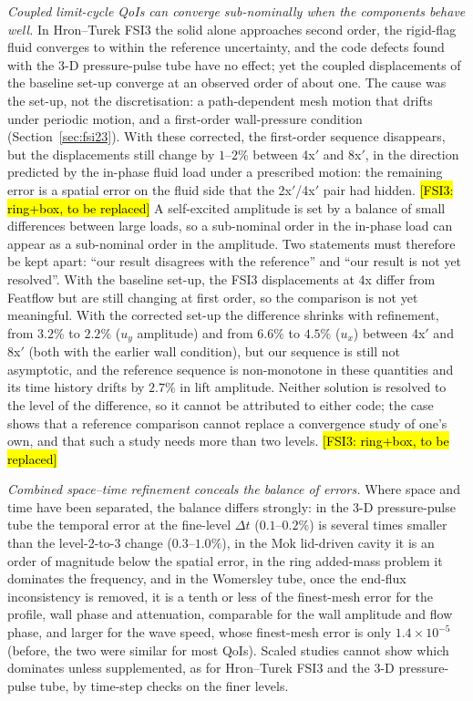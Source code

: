 \emph{Coupled limit-cycle QoIs can converge sub-nominally when the components behave well.}
In Hron--Turek FSI3 the solid alone approaches second order, the rigid-flag fluid converges to within the reference uncertainty, and the code defects found with the 3-D pressure-pulse tube have no effect; yet the coupled displacements of the baseline set-up converge at an observed order of about one. The cause was the set-up, not the discretisation: a path-dependent mesh motion that drifts under periodic motion, and a first-order wall-pressure condition (Section~\ref{sec:fsi23}). With these corrected, the first-order sequence disappears, but the displacements still change by $1$--$2\%$ between 4x$'$ and 8x$'$, in the direction predicted by the in-phase fluid load under a prescribed motion: the remaining error is a spatial error on the fluid side that the 2x$'$/4x$'$ pair had hidden. \hl{[FSI3: ring+box, to be replaced]}
A self-excited amplitude is set by a balance of small differences between large loads, so a sub-nominal order in the in-phase load can appear as a sub-nominal order in the amplitude.
Two statements must therefore be kept apart: ``our result disagrees with the reference'' and ``our result is not yet resolved''.
With the baseline set-up, the FSI3 displacements at 4x differ from Featflow but are still changing at first order, so the comparison is not yet meaningful. With the corrected set-up the difference shrinks with refinement, from $3.2\%$ to $2.2\%$ ($u_y$ amplitude) and from $6.6\%$ to $4.5\%$ ($u_x$) between 4x$'$ and 8x$'$ (both with the earlier wall condition), but our sequence is still not asymptotic, and the reference sequence is non-monotone in these quantities and its time history drifts by $2.7\%$ in lift amplitude. Neither solution is resolved to the level of the difference, so it cannot be attributed to either code; the case shows that a reference comparison cannot replace a convergence study of one's own, and that such a study needs more than two levels. \hl{[FSI3: ring+box, to be replaced]}

\emph{Combined space--time refinement conceals the balance of errors.}
Where space and time have been separated, the balance differs strongly: in the 3-D pressure-pulse tube the temporal error at the fine-level $\Delta t$ ($0.1$--$0.2\%$) is several times smaller than the level-2-to-3 change ($0.3$--$1.0\%$), in the Mok lid-driven cavity it is an order of magnitude below the spatial error, in the ring added-mass problem it dominates the frequency, and in the Womersley tube, once the end-flux inconsistency is removed, it is a tenth or less of the finest-mesh error for the profile, wall phase and attenuation, comparable for the wall amplitude and flow phase, and larger for the wave speed, whose finest-mesh error is only $1.4\times10^{-5}$ (before, the two were similar for most QoIs).
Scaled studies cannot show which dominates unless supplemented, as for Hron--Turek FSI3 and the 3-D pressure-pulse tube, by time-step checks on the finer levels.

